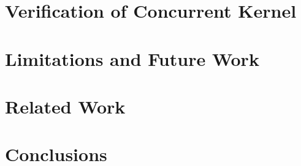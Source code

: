\documentclass[letterpaper,11pt]{yalephd}
\begin{document}
\chapter{Verification of Concurrent Kernel}
\label{chapter:concurrent}


\chapter{Limitations and Future Work}
\label{chapter:limitation}

\chapter{Related Work}
\label{chapter:related}

\chapter{Conclusions}
\label{chapter:conclusion}







%
%
%

\backmatter


\end{document}
